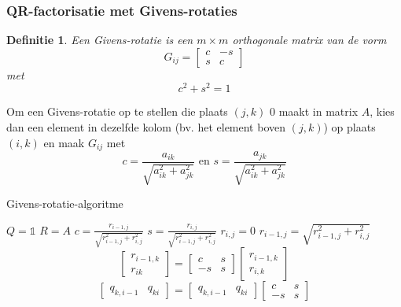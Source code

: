 \documentclass{article}
\newtheorem{mydef}{Definitie}
\begin{document}
	\subsubsection{QR-factorisatie met Givens-rotaties}
	
	\begin{mydef}
		Een Givens-rotatie is een $m \times m$ orthogonale matrix van de vorm
		$$
		G_{ij} = 
		\begin{bmatrix}
			c & -s \\
			s &  c  
		\end{bmatrix}
		$$
		met
		$$ c^2 + s^2 = 1 $$
	\end{mydef}

	Om een Givens-rotatie op te stellen die plaats $(j,k)$ $0$ maakt in matrix $A$, kies dan een element in dezelfde kolom (bv. het element boven $(j,k)$) op plaats $(i,k)$ en maak $G_{ij}$ met
	$$ c = \frac{a_{ik}}{\sqrt{a_{ik}^2 + a_{jk}^2}} \text{ en } s = \frac{a_{jk}}{\sqrt{a_{ik}^2 + a_{jk}^2}}$$
	
	\begin{algorithm}[!ht]
		\caption{Givens-rotatie-algoritme}
		\begin{algorithmic}[1]
				\State $Q=\mathbb{1}$
				\State $R=A$
						\State $c = \frac{r_{i-1,j}}{\sqrt{r_{i-1,j}^2 + r_{i,j}^2}}$
						\State $s = \frac{r_{i,j}}{\sqrt{r_{i-1,j}^2 + r_{i,j}^2}}$
						\State $r_{i,j} = 0$
						\State $r_{i-1,j} = \sqrt{r_{i-1,j}^2 + r_{i,j}^2}$
							\State 
							$$
								\begin{bmatrix}
									r_{i-1,k} \\
									r_{ik}
								\end{bmatrix}
								=
								\begin{bmatrix}
									c & s \\
									-s & s
								\end{bmatrix}
								\begin{bmatrix}
									r_{i-1,k} \\
									r_{i,k}
								\end{bmatrix}
							$$
						\EndFor
							\State
							$$
								\begin{bmatrix}
									q_{k,i-1} & q_{ki}
								\end{bmatrix}
								=
								\begin{bmatrix}
									q_{k,i-1} & q_{ki}
								\end{bmatrix}
								\begin{bmatrix}
									c & s \\
									-s & s
								\end{bmatrix}
							$$
						\EndFor
					\EndFor
				\EndFor
			\EndProcedure
		\end{algorithmic}
	\end{algorithm}
\end{document}
